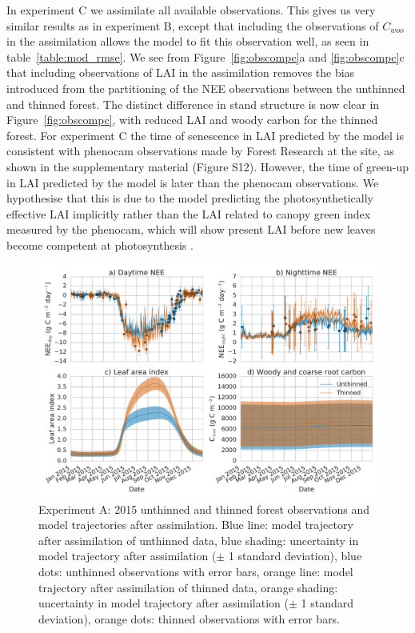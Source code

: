 \documentclass[draft,linenumbers]{agujournal}
\begin{document}
In experiment C we assimilate all available observations. This gives us very similar results as in experiment B, except that including the observations of \(C_{woo}\) in the assimilation allows the model to fit this observation well, as seen in table~\ref{table:mod_rmse}. We see from Figure~\ref{fig:obscompc}a and \ref{fig:obscompc}c that including observations of LAI in the assimilation removes the bias introduced from the partitioning of the NEE observations between the unthinned and thinned forest. The distinct difference in stand structure is now clear in Figure~\ref{fig:obscompc}, with reduced LAI and woody carbon for the thinned forest. For experiment C the time of senescence in LAI predicted by the model is consistent with phenocam observations made by Forest Research at the site, as shown in the supplementary material (Figure S12). However, the time of green-up in LAI predicted by the model is later than the phenocam observations. We hypothesise that this is due to the model predicting the photosynthetically effective LAI implicitly rather than the LAI related to canopy green index measured by the phenocam, which will show present LAI before new leaves become competent at photosynthesis \citep{reich1991leaf, Morecroft2003}.   

\begin{figure}[ht]
    \centering
        \includegraphics[width=\textwidth]{obs_compa.pdf}
\caption{Experiment A: 2015 unthinned and thinned forest observations and model trajectories after assimilation. Blue line: model trajectory after assimilation of unthinned data, blue shading: uncertainty in model trajectory after assimilation (\(\pm\) 1 standard deviation), blue dots: unthinned observations with error bars, orange line: model trajectory after assimilation of thinned data, orange shading: uncertainty in model trajectory after assimilation (\(\pm\) 1 standard deviation), orange dots: thinned observations with error bars.}
 \label{fig:obscompa}
 \end{figure}
 
\end{document}
